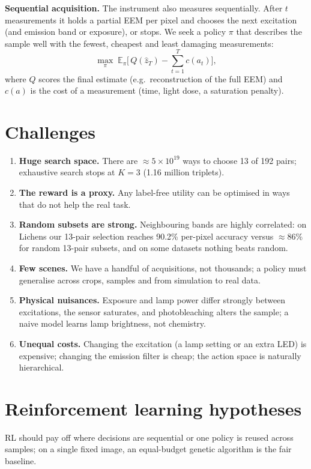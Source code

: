 \documentclass[11pt,a4paper]{article}
\begin{document}
\textbf{Sequential acquisition.} The instrument also measures sequentially. After $t$ measurements it holds a partial EEM per pixel and chooses the next excitation (and emission band or exposure), or stops. We seek a policy $\pi$ that describes the sample well with the fewest, cheapest and least damaging measurements:
\begin{equation*}
\max_{\pi} \; \mathbb{E}_{\pi}\Big[\, Q(\hat{z}_T) - \textstyle\sum_{t=1}^{T} c(a_t) \Big],
\end{equation*}
where $Q$ scores the final estimate (e.g.\ reconstruction of the full EEM) and $c(a)$ is the cost of a measurement (time, light dose, a saturation penalty).

\section{Challenges}
\begin{enumerate}
\item \textbf{Huge search space.} There are $\approx 5\times10^{19}$ ways to choose 13 of 192 pairs; exhaustive search stops at $K=3$ (1.16 million triplets).
\item \textbf{The reward is a proxy.} Any label-free utility can be optimised in ways that do not help the real task.
\item \textbf{Random subsets are strong.} Neighbouring bands are highly correlated: on Lichens our 13-pair selection reaches 90.2\% per-pixel accuracy versus $\approx$86\% for random 13-pair subsets, and on some datasets nothing beats random.
\item \textbf{Few scenes.} We have a handful of acquisitions, not thousands; a policy must generalise across crops, samples and from simulation to real data.
\item \textbf{Physical nuisances.} Exposure and lamp power differ strongly between excitations, the sensor saturates, and photobleaching alters the sample; a naive model learns lamp brightness, not chemistry.
\item \textbf{Unequal costs.} Changing the excitation (a lamp setting or an extra LED) is expensive; changing the emission filter is cheap; the action space is naturally hierarchical.
\end{enumerate}

\section{Reinforcement learning hypotheses}
RL should pay off where decisions are sequential or one policy is reused across samples; on a single fixed image, an equal-budget genetic algorithm is the fair baseline.
\end{document}
